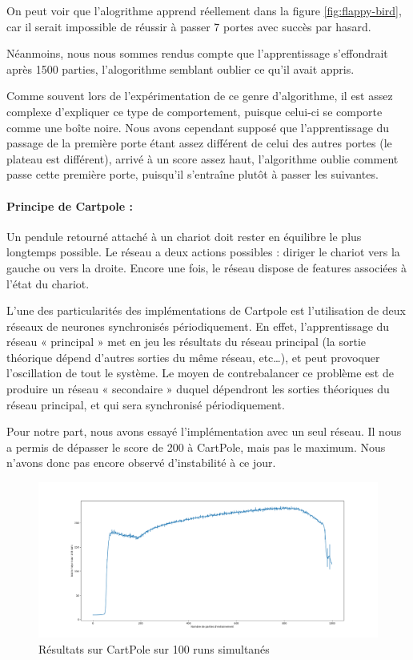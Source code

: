 \documentclass[
    10pt,
    a4paper,
    oneside,
    headinclude,footinclude,
    BCOR=5mm,
    captions=tableabove
]{scrartcl}
\begin{document}
On peut voir que l'alogrithme apprend réellement dans la figure \ref{fig:flappy-bird}, car il serait impossible de réussir à passer 7 portes avec succès par hasard.

Néanmoins, nous nous sommes rendus compte que l'apprentissage s'effondrait après 1500 parties, l'alogorithme semblant oublier ce qu'il avait appris.

Comme souvent lors de l'expérimentation de ce genre d'algorithme, il est assez complexe d'expliquer ce type de comportement, puisque celui-ci se comporte comme une boîte noire.
Nous avons cependant supposé que l'apprentissage du passage de la première porte étant assez différent de celui des autres portes (le plateau est différent), arrivé à un score assez haut, l'algorithme oublie comment passe cette première porte, puisqu'il s'entraîne plutôt à passer les suivantes.

\paragraph{Principe de Cartpole :}
Un pendule retourné attaché à un chariot doit rester en équilibre le plus longtemps possible. Le réseau a deux actions possibles : diriger le chariot vers la gauche ou vers la droite. Encore une fois, le réseau dispose de features associées à l’état du chariot.

L’une des particularités des implémentations de Cartpole est l’utilisation de deux réseaux de neurones synchronisés périodiquement. En effet, l’apprentissage du réseau « principal » met en jeu les résultats du réseau principal (la sortie théorique dépend d’autres sorties du même réseau, etc…), et peut provoquer l’oscillation de tout le système. Le moyen de contrebalancer ce problème est de produire un réseau « secondaire » duquel dépendront les sorties théoriques du réseau principal, et qui sera synchronisé périodiquement.

Pour notre part, nous avons essayé l'implémentation avec un seul réseau. Il nous a permis de dépasser le score de 200 à CartPole, mais pas le maximum. Nous n'avons donc pas encore observé d'instabilité à ce jour.

\begin{figure}
\includegraphics[width=\linewidth]{cartpole_1.png}
\centering
\caption{Résultats sur CartPole sur 100 runs simultanés}
\label{fig:cartpole_1}
\end{figure}
\end{document}
